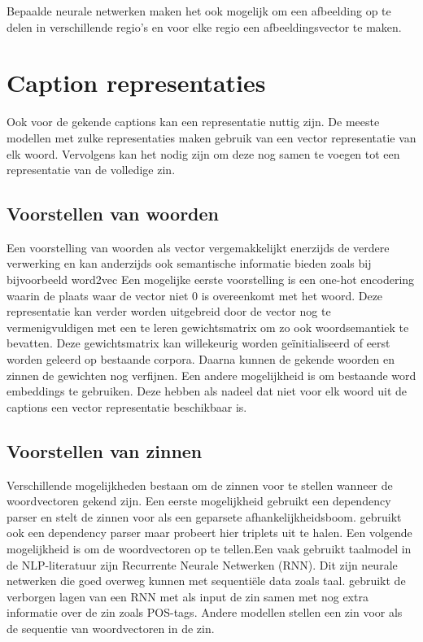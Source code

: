 Bepaalde neurale netwerken maken het ook mogelijk om een afbeelding op te delen in verschillende regio's en voor elke regio een afbeeldingsvector te maken.\cite{Karpathy2015}\cite{Fang}

\section{Caption representaties}
Ook voor de gekende captions kan een representatie nuttig zijn. De meeste modellen met zulke representaties maken gebruik van een vector representatie van elk woord. Vervolgens kan het nodig zijn om deze nog samen te voegen tot een representatie van de volledige zin.

\subsection{Voorstellen van woorden}
 Een voorstelling van woorden als vector vergemakkelijkt enerzijds de verdere verwerking en kan anderzijds ook semantische informatie bieden zoals bij bijvoorbeeld word2vec\cite{Mikolov2013}
 Een mogelijke eerste voorstelling is een one-hot encodering waarin de plaats waar de vector niet 0 is overeenkomt met het woord. Deze representatie kan verder worden uitgebreid door de vector nog te vermenigvuldigen met een te leren gewichtsmatrix om zo ook woordsemantiek te bevatten.  Deze gewichtsmatrix kan willekeurig worden ge\"initialiseerd of eerst worden geleerd op bestaande corpora.\cite{Lebret2013}\cite{Google}\cite{Mao} Daarna kunnen de gekende woorden en zinnen de gewichten nog verfijnen.  Een andere mogelijkheid is om bestaande word embeddings te gebruiken.\cite{mikolov} Deze hebben als nadeel dat niet voor elk woord uit de captions een vector representatie beschikbaar is. 
 
 \subsection{Voorstellen van zinnen}
 Verschillende mogelijkheden bestaan om de zinnen voor te stellen wanneer de woordvectoren gekend zijn. Een eerste mogelijkheid gebruikt een dependency parser en stelt de zinnen voor als een geparsete afhankelijkheidsboom.\cite{Socher}\cite{Karpathy} gebruikt ook een dependency parser maar probeert hier triplets uit te halen. Een volgende mogelijkheid is om de woordvectoren op te tellen.\cite{Lebret}Een vaak gebruikt taalmodel in de NLP-literatuur zijn Recurrente Neurale Netwerken (RNN).\cite{Mikolov2010} Dit zijn neurale netwerken die goed overweg kunnen met sequenti\"ele data zoals taal.\cite{Kiros} gebruikt de verborgen lagen van een RNN met als input de zin samen met nog extra informatie over de zin zoals POS-tags. Andere modellen stellen een zin voor als de sequentie van woordvectoren in de zin.
 
